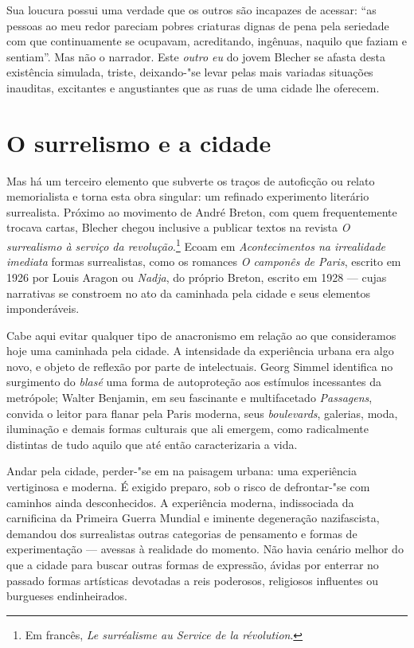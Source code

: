 Sua loucura possui uma verdade que os outros são incapazes de acessar: ``as pessoas ao meu redor pareciam pobres criaturas dignas de pena pela seriedade com que continuamente se ocupavam, acreditando, ingênuas, naquilo que faziam e sentiam''. Mas não o narrador. Este \textit{outro eu} do jovem Blecher se afasta desta existência simulada, triste, deixando-"se levar pelas mais variadas situações inauditas, excitantes e angustiantes que as ruas de uma cidade lhe oferecem. 

\section{O surrelismo e a cidade}

Mas há um terceiro elemento que subverte os traços de autoficção ou relato memorialista e torna esta obra singular: um refinado experimento literário surrealista. Próximo ao movimento de André Breton, com quem frequentemente trocava cartas, Blecher chegou inclusive a publicar textos na revista \textit{O surrealismo à serviço da revolução}.\footnote{Em francês, \textit{Le surréalisme au Service de la révolution}.} Ecoam em \textit{Acontecimentos na irrealidade imediata} formas surrealistas, como os romances \textit{O camponês de Paris}, escrito em 1926 por Louis Aragon ou \textit{Nadja}, do próprio Breton, escrito em 1928 --- cujas narrativas se constroem no ato da caminhada pela cidade e seus elementos imponderáveis.

Cabe aqui evitar qualquer tipo de anacronismo em relação ao que consideramos hoje uma caminhada pela cidade. A intensidade da experiência urbana era algo novo, e objeto de reflexão por parte de intelectuais. Georg Simmel identifica no surgimento do \textit{blasé} uma forma de autoproteção aos estímulos incessantes da metrópole; Walter Benjamin, em seu fascinante e multifacetado \textit{Passagens}, convida o leitor para flanar pela Paris moderna, seus \textit{boulevards}, galerias, moda, iluminação e demais formas culturais que ali emergem, como radicalmente distintas de tudo aquilo que até então caracterizaria a vida.

Andar pela cidade, perder-"se em na paisagem urbana: uma experiência vertiginosa e moderna. É exigido preparo, sob o risco de defrontar-"se com caminhos ainda desconhecidos. A experiência moderna, indissociada da carnificina da Primeira Guerra Mundial e iminente degeneração nazifascista, demandou dos surrealistas outras categorias de pensamento e formas de experimentação --- avessas à realidade do momento. Não havia cenário melhor do que a cidade para buscar outras formas de expressão, ávidas por enterrar no passado formas artísticas devotadas a reis poderosos, religiosos influentes ou burgueses endinheirados.

